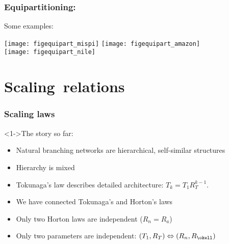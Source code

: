 \begin{frame}[label=]
  \frametitle{Equipartitioning:}
  \begin{block}{Some examples:}
    \begin{center}
      \texttt{[image: figequipart\_mispi]}
      \texttt{[image: figequipart\_amazon]} \\
      \texttt{[image: figequipart\_nile]}
    \end{center}
  \end{block}

\end{frame}




\section{Scaling\ relations}

\begin{frame}[label=]
  \frametitle{Scaling laws}

  \begin{block}<1->{The story so far:}
    \begin{itemize}
    \item<2-> Natural branching networks are \alert{hierarchical},
      \alert{self-similar} structures
    \item<3-> Hierarchy is \alert{mixed}
    \item<4-> Tokunaga's law describes detailed architecture: $T_k = T_1R_T^{k-1}$.
    \item<5-> We have connected Tokunaga's and Horton's laws
    \item<6-> Only two Horton laws are independent ($R_n = R_a$)
    \item<7-> Only \alert{two} parameters are \alert{independent}: $(T_1,R_T) \Leftrightarrow (R_n,R_\okell)$
    \end{itemize}
  \end{block}
  
\end{frame}

